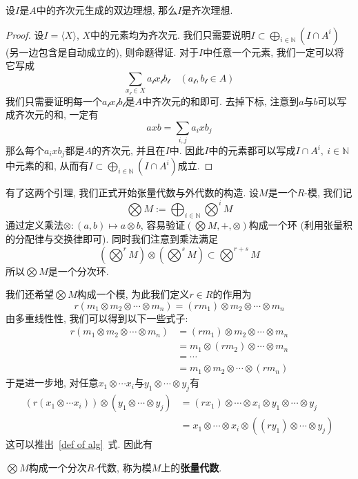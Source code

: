 \begin{lem}\label{homogeneous ideal}
    设$I$是$A$中的齐次元生成的双边理想, 那么$I$是齐次理想.
\end{lem}
\begin{proof}
    设$I=\langle X\rangle$, $X$中的元素均为齐次元.
    我们只需要说明$\displaystyle I\subset\bigoplus_{i\in\mathbb{N}}(I\cap A^i)$ (另一边包含是自动成立的), 则命题得证.
    对于$I$中任意一个元素, 我们一定可以将它写成
    \[\sum_{x_\mscrl\in X}a_\mscrl x_\mscrl b_\mscrl\quad(a_\mscrl,b_\mscrl\in A)\]
    我们只需要证明每一个$a_\mscrl x_\mscrl b_\mscrl$是$A$中齐次元的和即可.
    去掉下标, 注意到$a$与$b$可以写成齐次元的和, 一定有
    \[axb=\sum_{i,j}a_ixb_j\]
    那么每个$a_ixb_j$都是$A$的齐次元, 并且在$I$中.
    因此$I$中的元素都可以写成$I\cap A^i,\ i\in\mathbb{N}$中元素的和, 从而有$\displaystyle I\subset\bigoplus_{i\in\mathbb{N}}(I\cap A^i)$成立.
\end{proof}

有了这两个引理, 我们正式开始张量代数与外代数的构造.
设$M$是一个$R$-模, 我们记
\[\bigotimes{M}:=\bigoplus_{i\in\mathbb{N}}\bigotimes\nolimits^i M\]
通过定义乘法$\otimes:(a,b)\mapsto a\otimes b$, 容易验证$(\bigotimes M,+,\otimes)$构成一个环 (利用张量积的分配律与交换律即可).
同时我们注意到乘法满足
\[\left(\bigotimes\nolimits^r M\right)\otimes\left(\bigotimes\nolimits^s M\right)\subset\bigotimes\nolimits^{r+s} M\]
所以$\bigotimes M$是一个分次环.

我们还希望$\bigotimes M$构成一个模, 为此我们定义$r\in R$的作用为
\[r(m_1\otimes m_2\otimes\cdots\otimes m_n)=(rm_1)\otimes m_2\otimes\cdots\otimes m_n\]
由多重线性性, 我们可以得到以下一些式子:
\begin{align*}
    r(m_1\otimes m_2\otimes\cdots\otimes m_n)&=(rm_1)\otimes m_2\otimes\cdots\otimes m_n\\
    &=m_1\otimes(rm_2)\otimes\cdots\otimes m_n\\
    &=\cdots\\
    &=m_1\otimes m_2\otimes\cdots\otimes(rm_n)
\end{align*}
于是进一步地, 对任意$x_1\otimes\cdots x_i$与$y_1\otimes\cdots\otimes y_j$有
\begin{align*}
    (r(x_1\otimes\cdots x_i))\otimes(y_1\otimes\cdots\otimes y_j)&=(rx_1)\otimes\cdots\otimes x_i\otimes y_1\otimes\cdots\otimes y_j\\
    &=x_1\otimes\cdots\otimes x_i\otimes((ry_1)\otimes\cdots\otimes y_j)
\end{align*}
这可以推出~\eqref{def of alg}~式.
因此有
\begin{prop}
    $\bigotimes M$构成一个分次$R$-代数, 称为模$M$上的\textbf{张量代数}.
\end{prop}

